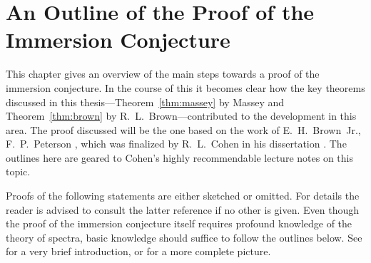 % 

\chapter
{An Outline of the Proof of the Immersion Conjecture}
\label{chap:outlook}

This chapter gives an overview of the main steps towards a proof 
of the immersion conjecture.
In the course of this it becomes clear how the key theorems discussed
in this thesis---Theorem~\ref{thm:massey} by Massey and
Theorem~\ref{thm:brown} by R.~L.~Brown---contributed to the
development in this area.
The proof discussed will be the one based on the work of
E.~H.~Brown~Jr., F.~P.~Peterson \cite{brownpeterson}, which was
finalized by R.~L.~Cohen in his dissertation \cite{cohen}. The
outlines here are geared to Cohen's highly recommendable lecture notes
\cite{immersionconj} on this topic.

Proofs of the following statements are either sketched or omitted. For
details the reader is advised to consult the latter reference if no
other is given. Even though the proof of the immersion conjecture
itself requires profound knowledge of the theory of spectra, basic
knowledge should suffice to follow the outlines below. See
\cite[p.~77ff]{immersionconj} for a very brief introduction, or
\cite{switzer} for a more complete picture.


